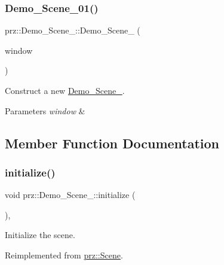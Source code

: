 \subsubsection{\texorpdfstring{Demo\_Scene\_01()}{Demo\_Scene\_01()}}
{\footnotesize\ttfamily prz\+::\+Demo\+\_\+\+Scene\+\_\+::\+Demo\+\_\+\+Scene\+\_ (\begin{DoxyParamCaption}\item[{Window \&}]{window }\end{DoxyParamCaption})}



Construct a new \mbox{\hyperlink{classprz_1_1_demo___scene__01}{Demo\+\_\+\+Scene\+\_}}. 


\begin{DoxyParams}{Parameters}
{\em window} & \\
\hline
\end{DoxyParams}


\subsection{Member Function Documentation}
\mbox{\label{classprz_1_1_demo___scene__01_acaf389e824f310d3f3b06e1c8b510ff2}} 
\subsubsection{\texorpdfstring{initialize()}{initialize()}}
{\footnotesize\ttfamily void prz\+::\+Demo\+\_\+\+Scene\+\_\+::initialize (\begin{DoxyParamCaption}{ }\end{DoxyParamCaption})\hspace{0.3cm}{\ttfamily [override]}, {\ttfamily [virtual]}}



Initialize the scene. 



Reimplemented from \mbox{\hyperlink{classprz_1_1_scene_ad8ae9e750f1d233f7026cba59241f419}{prz\+::\+Scene}}.

\mbox{\label{classprz_1_1_demo___scene__01_ad452238849b24043acb89b1d76f996cb}} 
